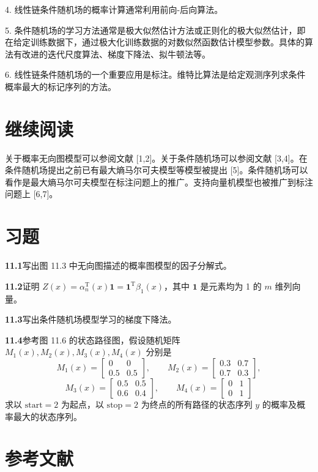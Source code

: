 \documentclass[UTF8, 12pt, fontset=fandol, oneside]{ctexart}
\begin{document}
4. 线性链条件随机场的概率计算通常利用前向-后向算法。

5. 条件随机场的学习方法通常是极大似然估计方法或正则化的极大似然估计，即在给定训练数据下，通过极大化训练数据的对数似然函数估计模型参数。具体的算法有改进的迭代尺度算法、梯度下降法、拟牛顿法等。

6. 线性链条件随机场的一个重要应用是标注。维特比算法是给定观测序列求条件概率最大的标记序列的方法。

\section*{继续阅读}

关于概率无向图模型可以参阅文献 [1,2]。关于条件随机场可以参阅文献 [3,4]。在条件随机场提出之前已有最大熵马尔可夫模型等模型被提出 [5]。条件随机场可以看作是最大熵马尔可夫模型在标注问题上的推广。支持向量机模型也被推广到标注问题上 [6,7]。

\section*{习题}

\noindent\textbf{11.1}\quad 写出图 11.3 中无向图描述的概率图模型的因子分解式。

\noindent\textbf{11.2}\quad 证明 $Z(x)=\alpha_n^{\mathrm T}(x)\mathbf 1=\mathbf 1^{\mathrm T}\beta_1(x)$，其中 $\mathbf 1$ 是元素均为 1 的 $m$ 维列向量。

\noindent\textbf{11.3}\quad 写出条件随机场模型学习的梯度下降法。

\noindent\textbf{11.4}\quad 参考图 11.6 的状态路径图，假设随机矩阵 $M_1(x),M_2(x),M_3(x),M_4(x)$ 分别是
\[
M_1(x)=
\begin{bmatrix}
0&0\\
0.5&0.5
\end{bmatrix},\qquad
M_2(x)=
\begin{bmatrix}
0.3&0.7\\
0.7&0.3
\end{bmatrix},
\]
\[
M_3(x)=
\begin{bmatrix}
0.5&0.5\\
0.6&0.4
\end{bmatrix},\qquad
M_4(x)=
\begin{bmatrix}
0&1\\
0&1
\end{bmatrix}
\]
求以 $\mathrm{start}=2$ 为起点，以 $\mathrm{stop}=2$ 为终点的所有路径的状态序列 $y$ 的概率及概率最大的状态序列。

\section*{参考文献}
\end{document}
